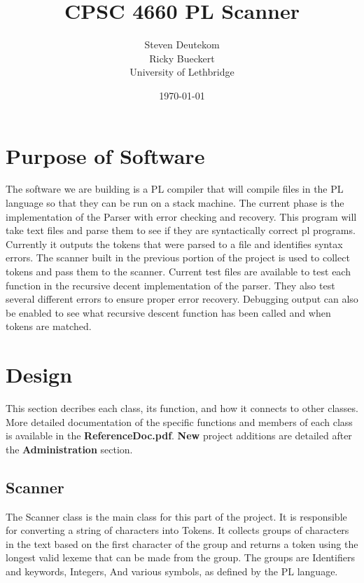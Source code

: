 \documentclass{article}
\begin{document}
\title{CPSC 4660 PL Scanner}
\author{Steven Deutekom\\
        Ricky Bueckert\\
        University of Lethbridge}
\date{\today}

\maketitle

\section{Purpose of Software}
The software we are building is a PL compiler that will compile files in the PL
language so that they can be run on a stack machine. The current phase is the
implementation of the Parser with error checking and recovery.
This program will take text files and parse them to see if they are syntactically correct
pl programs. Currently it outputs the tokens that were parsed to a file and identifies
syntax errors. The scanner built in the previous portion of the project is used to
collect tokens and pass them to the scanner. Current test files are available to
test each function in the recursive decent implementation of the parser. They also test
several different errors to ensure proper error recovery. Debugging output can also be
enabled to see what recursive descent function has been called and when tokens are matched.


\section{Design}
This section decribes each class, its function, and how it connects to other classes.
More detailed documentation of the specific functions and members of each class
is available in the \textbf{ReferenceDoc.pdf}. \textbf{New} project additions are
detailed after the \textbf{Administration} section.

\subsection{Scanner}
The Scanner class is the main class for this part of the project. It is responsible
for converting a string of characters into Tokens. It collects groups of characters
in the text based on the first character of the group and returns a token
using the longest valid lexeme that can be made from the group. The groups
are Identifiers and keywords, Integers, And various symbols, as defined by the
PL language.
\end{document}
